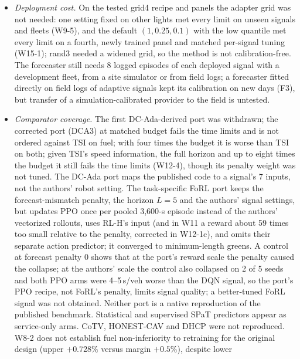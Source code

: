 \begin{itemize}
R15-U lowers it to $-0.09$ (upper $+0.09$) on the same signals and fleets. Field data weigh these dependences unequally: measured fuel
favours PHEMlight5, under which the revision saves, and measured trajectories favour IDM, under which it does not; SUMO's Krauss cars brake
later and harder at a stop than measured drivers, so the Krauss results likely overstate any eco-driving benefit. The fleet's own fixed-time
benefit survives PHEMlight5 ($-4.43\%$). A 1-s minimum delay, implemented by a per-link query cache, removes most of the saving; an exact periodic broadcast with
fixed latency was not modelled.
\item \emph{Deployment cost.} On the tested grid4 recipe and panels the adapter grid was not needed: one setting fixed on other lights met
every limit on unseen signals and fleets (W9-5), and the default $(1,0.25,0.1)$ with the low quantile met every limit on a fourth, newly
trained panel and matched per-signal tuning (W15-1); rand3 needed a widened grid, so the method is not calibration-free. The forecaster still needs 8 logged episodes of each deployed signal with a development fleet, from a site simulator or
from field logs; a forecaster fitted directly on field logs of adaptive signals kept its calibration on new days (F3), but transfer
of a simulation-calibrated provider to the field is untested.
\item \emph{Comparator coverage.} The first DC-Ada-derived port was withdrawn; the corrected port (DCA3) at matched budget fails the time limits and is not ordered against TSI on fuel; with four times the budget it is worse than TSI on both; given TSI's speed information, the full horizon and up to eight times the budget it still fails the time limits (W12-4), though its penalty weight was not tuned. The DC-Ada port maps the published code to a signal's 7 inputs, not the authors' robot setting. The task-specific FoRL port keeps the
forecast-mismatch penalty, the horizon $L=5$ and the authors' signal settings, but updates PPO once per pooled 3,600-s episode instead
of the authors' vectorized rollouts, uses RL-H's input (and in W11 a reward about 59 times too small relative to the penalty, corrected in W12-1c), and omits their
separate action predictor; it converged to
minimum-length greens. A control at forecast penalty 0 shows that at the port's reward scale the penalty caused the collapse; at the
authors' scale the control also collapsed on 2 of 5 seeds and both PPO arms were 4--5\,s/veh worse than the DQN signal, so the port's
PPO recipe, not FoRL's penalty, limits signal quality; a better-tuned FoRL signal was not obtained. Neither port is a native reproduction of the published benchmark. Statistical and supervised SPaT predictors appear as service-only arms. CoTV, HONEST-CAV and DHCP were not reproduced. W8-2 does not establish fuel non-inferiority to retraining for the original design (upper $+0.728\%$ versus margin $+0.5\%$), despite lower

\end{itemize}
